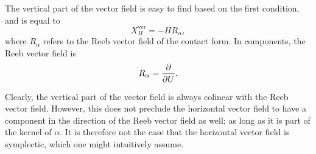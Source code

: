 The vertical part of the vector field is easy to find based on the first condition, and is equal to
\begin{equation}
    X_H^\text{ver} = - H R_\alpha, 
    \label{eq:vertical_vf}
\end{equation}
where $R_\alpha$ refers to the Reeb vector field of the contact form. In components, the Reeb vector field is
$$ 
    R_\alpha = \pdv{}{U}.
$$ 
\begin{remark}
    Clearly, the vertical part of the vector field is always colinear with the Reeb vector field. However, this does not preclude the horizontal vector field to have a component in the direction of the Reeb vector field as well; as long as it is part of the kernel of $\alpha$. It is therefore not the case that the horizontal vector field is symplectic, which one might intuitively assume.
\end{remark}

